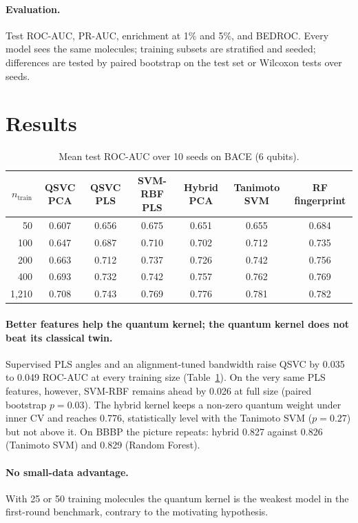 \documentclass[11pt]{article}
\begin{document}
\paragraph{Evaluation.} Test ROC-AUC, PR-AUC, enrichment at 1\% and 5\%, and BEDROC. Every model
sees the same molecules; training subsets are stratified and seeded; differences are tested by
paired bootstrap on the test set or Wilcoxon tests over seeds.

\section{Results}

\begin{table}[h]
\centering
\caption{Mean test ROC-AUC over 10 seeds on BACE (6 qubits).}
\label{tab:final}
\small
\begin{tabular}{rcccccc}
\toprule
$n_\text{train}$ & QSVC PCA & QSVC PLS & SVM-RBF PLS & Hybrid PCA & Tanimoto SVM & RF fingerprint\\
\midrule
50 & 0.607 & 0.656 & 0.675 & 0.651 & 0.655 & 0.684\\
100 & 0.647 & 0.687 & 0.710 & 0.702 & 0.712 & 0.735\\
200 & 0.663 & 0.712 & 0.737 & 0.726 & 0.742 & 0.756\\
400 & 0.693 & 0.732 & 0.742 & 0.757 & 0.762 & 0.769\\
1{,}210 & 0.708 & 0.743 & 0.769 & 0.776 & 0.781 & 0.782\\
\bottomrule
\end{tabular}
\end{table}

\paragraph{Better features help the quantum kernel; the quantum kernel does not beat its
classical twin.} Supervised PLS angles and an alignment-tuned bandwidth raise QSVC by 0.035 to
0.049 ROC-AUC at every training size (Table~\ref{tab:final}). On the very same PLS features,
however, SVM-RBF remains ahead by 0.026 at full size (paired bootstrap $p=0.03$). The hybrid
kernel keeps a non-zero quantum weight under inner CV and reaches 0.776, statistically level
with the Tanimoto SVM ($p=0.27$) but not above it. On BBBP the picture repeats: hybrid 0.827
against 0.826 (Tanimoto SVM) and 0.829 (Random Forest).

\paragraph{No small-data advantage.} With 25 or 50 training molecules the quantum kernel is the
weakest model in the first-round benchmark, contrary to the motivating hypothesis.
\end{document}
